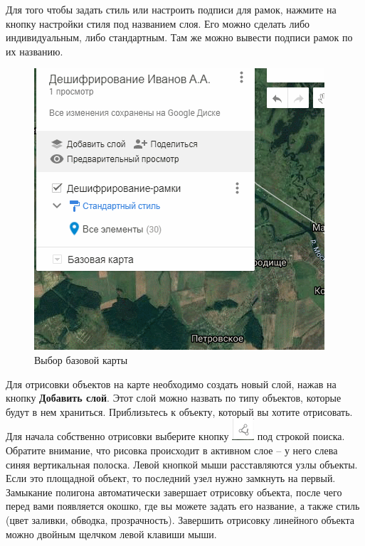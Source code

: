\documentclass[
  12pt,
]{book}
\begin{document}
Для того чтобы задать стиль или настроить подписи для рамок, нажмите на кнопку настройки стиля под названием слоя. Его можно сделать либо индивидуальным, либо стандартным. Там же можно вывести подписи рамок по их названию.

\begin{figure}
\centering
\includegraphics{images/Interpretation/Layer_style.gif}
\caption{Выбор базовой карты}
\end{figure}

Для отрисовки объектов на карте необходимо создать новый слой, нажав на кнопку \textbf{Добавить слой}. Этот слой можно назвать по типу объектов, которые будут в нем храниться. Приблизьтесь к объекту, который вы хотите отрисовать. Для начала собственно отрисовки выберите кнопку \includegraphics{images/Interpretation/Draw.png} под строкой поиска. Обратите внимание, что рисовка происходит в активном слое -- у него слева синяя вертикальная полоска. Левой кнопкой мыши расставляются узлы объекты. Если это площадной объект, то последний узел нужно замкнуть на первый. Замыкание полигона автоматически завершает отрисовку объекта, после чего перед вами появляется окошко, где вы можете задать его название, а также стиль (цвет заливки, обводка, прозрачность). Завершить отрисовку линейного объекта можно двойным щелчком левой клавиши мыши.
\end{document}
